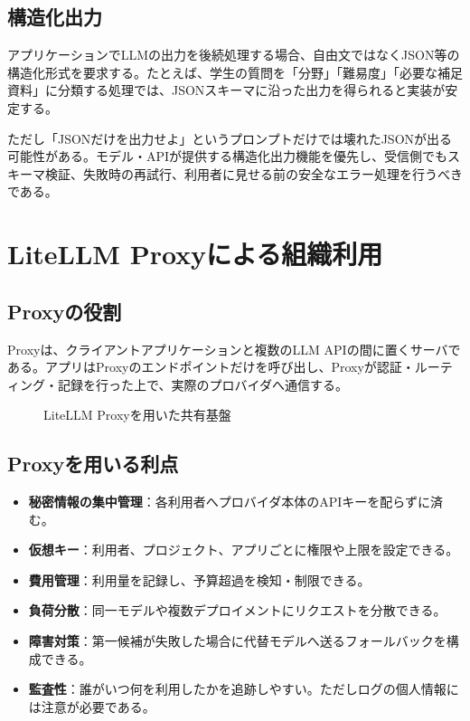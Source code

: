 \documentclass[11pt,a4paper]{bxjsarticle}
\begin{document}
\subsection{構造化出力}
アプリケーションでLLMの出力を後続処理する場合、自由文ではなくJSON等の構造化形式を要求する。たとえば、学生の質問を「分野」「難易度」「必要な補足資料」に分類する処理では、JSONスキーマに沿った出力を得られると実装が安定する。

ただし「JSONだけを出力せよ」というプロンプトだけでは壊れたJSONが出る可能性がある。モデル・APIが提供する構造化出力機能を優先し、受信側でもスキーマ検証、失敗時の再試行、利用者に見せる前の安全なエラー処理を行うべきである。

\section{LiteLLM Proxyによる組織利用}
\subsection{Proxyの役割}
Proxyは、クライアントアプリケーションと複数のLLM APIの間に置くサーバである。アプリはProxyのエンドポイントだけを呼び出し、Proxyが認証・ルーティング・記録を行った上で、実際のプロバイダへ通信する。

\begin{figure}[H]
\centering
{}
\caption{LiteLLM Proxyを用いた共有基盤}
\end{figure}

\subsection{Proxyを用いる利点}
\begin{itemize}
  \item \textbf{秘密情報の集中管理}：各利用者へプロバイダ本体のAPIキーを配らずに済む。
  \item \textbf{仮想キー}：利用者、プロジェクト、アプリごとに権限や上限を設定できる。
  \item \textbf{費用管理}：利用量を記録し、予算超過を検知・制限できる。
  \item \textbf{負荷分散}：同一モデルや複数デプロイメントにリクエストを分散できる。
  \item \textbf{障害対策}：第一候補が失敗した場合に代替モデルへ送るフォールバックを構成できる。
  \item \textbf{監査性}：誰がいつ何を利用したかを追跡しやすい。ただしログの個人情報には注意が必要である。
\end{itemize}
\end{document}
